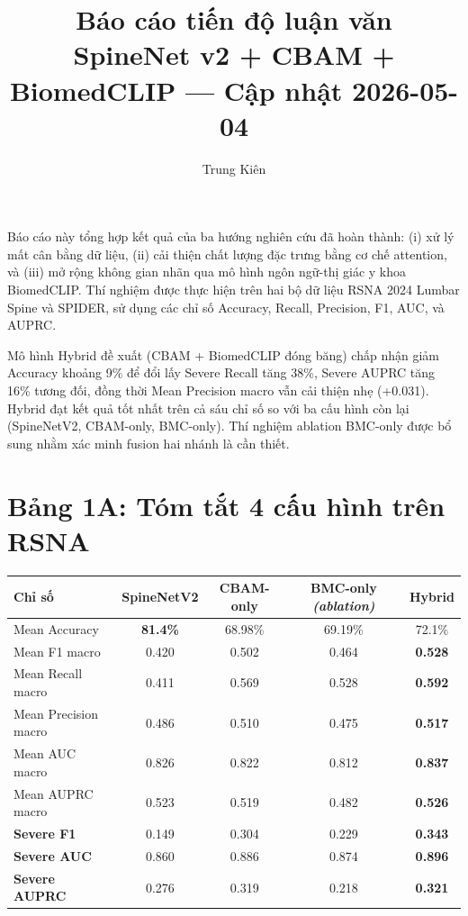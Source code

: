 \documentclass[11pt,a4paper]{article}
\title{\textbf{Báo cáo tiến độ luận văn} \\ \large SpineNet v2 + CBAM + BiomedCLIP --- Cập nhật 2026-05-04}
\author{Trung Kiên}
\date{}
\newcommand{\best}[1]{\textcolor{best}{\textbf{#1}}}
\begin{document}
\maketitle

\vspace{-1.5em}
\noindent Báo cáo này tổng hợp kết quả của ba hướng nghiên cứu đã hoàn thành: (i) xử lý mất cân bằng dữ liệu, (ii) cải thiện chất lượng đặc trưng bằng cơ chế attention, và (iii) mở rộng không gian nhãn qua mô hình ngôn ngữ-thị giác y khoa BiomedCLIP. Thí nghiệm được thực hiện trên hai bộ dữ liệu RSNA 2024 Lumbar Spine và SPIDER, sử dụng các chỉ số Accuracy, Recall, Precision, F1, AUC, và AUPRC.

\vspace{0.5em}
\noindent Mô hình Hybrid đề xuất (CBAM + BiomedCLIP đóng băng) chấp nhận giảm Accuracy khoảng 9\% để đổi lấy Severe Recall tăng 38\%, Severe AUPRC tăng 16\% tương đối, đồng thời Mean Precision macro vẫn cải thiện nhẹ (+0.031). Hybrid đạt kết quả tốt nhất trên cả sáu chỉ số so với ba cấu hình còn lại (SpineNetV2, CBAM-only, BMC-only). Thí nghiệm ablation BMC-only được bổ sung nhằm xác minh fusion hai nhánh là cần thiết.

\section*{Bảng 1A: Tóm tắt 4 cấu hình trên RSNA}

\begin{tabular}{@{}lcccc@{}}
\toprule
\rowcolor{tablehdr}
\textbf{Chỉ số} & SpineNetV2 & CBAM-only & BMC-only \emph{(ablation)} & \best{Hybrid} \\
\midrule
Mean Accuracy & \best{81.4\%} & 68.98\% & 69.19\% & 72.1\% \\
Mean F1 macro & 0.420 & 0.502 & 0.464 & \best{0.528} \\
Mean Recall macro & 0.411 & 0.569 & 0.528 & \best{0.592} \\
Mean Precision macro & 0.486 & 0.510 & 0.475 & \best{0.517} \\
Mean AUC macro & 0.826 & 0.822 & 0.812 & \best{0.837} \\
Mean AUPRC macro & 0.523 & 0.519 & 0.482 & \best{0.526} \\
\midrule
\textbf{Severe F1} & 0.149 & 0.304 & 0.229 & \best{0.343} \\
\textbf{Severe AUC} & 0.860 & 0.886 & 0.874 & \best{0.896} \\
\textbf{Severe AUPRC} & 0.276 & 0.319 & 0.218 & \best{0.321} \\
\bottomrule
\end{tabular}
\end{document}
